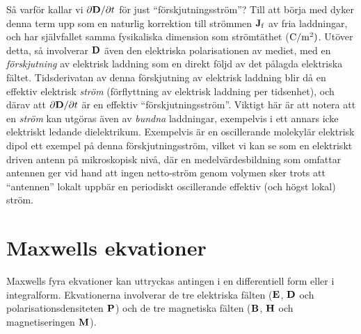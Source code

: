 S{\aa} varf{\"o}r kallar vi ${{\partial{\bf D}}/{\partial t}}$ f{\"o}r just
``f{\"o}rskjutningsstr{\"o}m''? Till att b{\"o}rja med dyker denna term upp
som en naturlig korrektion till str{\"o}mmen ${\bf J}_{\rm f}$ av fria
laddningar, och har sj{\"a}lvfallet samma fysikaliska dimension som
str{\"o}mt{\"a}thet (${\rm C}/{\rm m}^2)$. Ut{\"o}ver detta, s{\aa} involverar
${\bf D}$ {\"a}ven den elektriska polarisationen av mediet, med en
{\it f{\"o}rskjutning} av elektrisk laddning som en direkt f{\"o}ljd av det
p{\aa}lagda elektriska f{\"a}ltet. Tidsderivatan av denna f{\"o}rskjutning av
elektrisk laddning blir d{\aa} en effektiv elektrisk {\it str{\"o}m}
(f{\"o}rflyttning av elektrisk laddning per tidsenhet), och d{\"a}rav att
${{\partial{\bf D}}/{\partial t}}$ {\"a}r en effektiv
``f{\"o}rskjutningsstr{\"o}m''. Viktigt h{\"a}r {\"a}r att notera att en
{\it str{\"o}m} kan utg{\"o}ras {\"a}ven av {\it bundna} laddningar,
exempelvis i ett annars icke elektriskt ledande dielektrikum.
\noindent
Exempelvis {\"a}r en oscillerande molekyl{\"a}r elektrisk dipol ett exempel
p{\aa} denna f{\"o}rskjutningsstr{\"o}m, vilket vi kan se som en elektriskt
driven antenn p{\aa} mikroskopisk niv{\aa}, d{\"a}r en medelv{\"a}rdesbildning
som omfattar antennen ger vid hand att ingen netto-str{\"o}m genom volymen sker
trots att ``antennen'' lokalt uppb{\"a}r en periodiskt oscillerande effektiv
(och h{\"o}gst lokal) str{\"o}m.
\vfill\eject

\section{Maxwells ekvationer}
Maxwells fyra ekvationer
kan uttryckas antingen i en differentiell form eller i integralform.
Ekvationerna involverar de tre elektriska f{\"a}lten (${\bf E}$, ${\bf D}$
och polarisationsdensiteten ${\bf P}$) och de tre magnetiska f{\"a}lten
(${\bf B}$, ${\bf H}$ och magnetiseringen ${\bf M}$).

